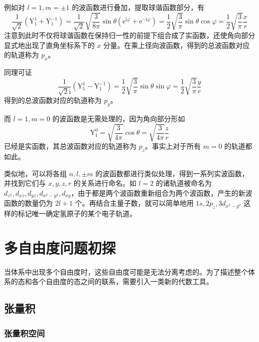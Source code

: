 \documentclass[cn,10pt,math=newtx,citestyle=gb7714-2015,bibstyle=gb7714-2015]{elegantbook}
\def\mr{\mathrm}
\def\e{\mathrm e}
\def\i{\mathrm i}
\def\vphi{\varphi}
\begin{document}
\begin{remark}
例如对 $l=1,m=\pm 1$ 的波函数进行叠加，提取球谐函数部分，有
\begin{equation}
    \frac{1}{\sqrt 2}(\mr Y_1^1+\mr Y_1^{-1}) = \frac{1}{\sqrt 2}\sqrt{\frac{3}{8\pi}}\sin\theta\left(\e^{\i\vphi}+\e^{-\i\vphi}\right) = \frac 1 2\sqrt{\frac 3 \pi}\sin\theta\cos\vphi = \frac 1 2\sqrt{\frac 3 \pi}\frac x r
\end{equation}
注意到此时不仅将球谐函数在保持归一性的前提下组合成了实函数，还使角向部分显式地出现了直角坐标系下的 $x$ 分量。在乘上径向波函数，得到的总波函数对应的轨道称为 $p_x$。

同理可证
\begin{equation}
    \frac{1}{\sqrt 2\i}(\mr Y_1^1-\mr Y_1^{-1}) = \frac 1 2\sqrt{\frac 3 \pi}\sin\theta\sin\vphi=\frac 1 2\sqrt{\frac 3 \pi}\frac y r
\end{equation}
得到的总波函数对应的轨道称为 $p_y$。

而 $l = 1,m=0$ 的波函数是无需处理的，因为角向部分形如
\begin{equation}
    \mr Y_1^0 = \sqrt{\frac 3{4\pi}}\cos\theta=\sqrt{\frac 3{4\pi}}\frac z r
\end{equation}
已经是实函数，其总波函数对应的轨道称为 $p_z$。事实上对于所有 $m=0$ 的轨道都如此。
\end{remark}

类似地，可以将各组 $n,l,\pm m$ 的波函数都进行类似处理，得到一系列实波函数，并找到它们与 $x,y,z,r$ 的关系进行命名。如 $l=2$ 的诸轨道被命名为 $d_{z^2},d_{xz},d_{yz},d_{x^2-y^2},d_{xy}$，由于都是两个波函数重新组合为两个波函数，产生的新波函数的数量仍为 $2l+1$ 个。再结合主量子数，就可以简单地用 $1s, 2p_z, 3d_{x^2-y^2}$ 这样的标记唯一确定氢原子的某个电子轨道。

\section{多自由度问题初探}

当体系中出现多个自由度时，这些自由度可能是无法分离考虑的。为了描述整个体系的态和各个自由度的态之间的联系，需要引入一类新的代数工具。

\subsection{张量积}

\subsubsection{张量积空间}
\end{document}
